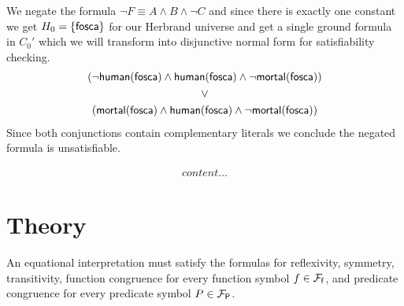 

	We negate the formula $\lnot F \equiv A\land B \land\lnot C$ and since there is exactly one constant we get
	$H_0 = \{ \mathsf{fosca} \}$ for our Herbrand universe and get a single ground formula in $C_0'$
	which we will transform into 
	disjunctive normal form for satisfiability checking.
%
\begin{gather*}
(\lnot\mathsf{human}(\mathsf{fosca})\land\mathsf{human}(\mathsf{fosca})\land\lnot\mathsf{mortal}(\mathsf{fosca}))
\\ 
\lor
\\ 
(\mathsf{mortal}(\mathsf{fosca})\land\mathsf{human}(\mathsf{fosca})\land\lnot\mathsf{mortal}(\mathsf{fosca}))
\end{gather*}
Since both conjunctions contain complementary literals we conclude the negated formula is unsatisfiable.


\begin{gather*}
content...
\end{gather*}


\section{Theory}



	An equational interpretation must satisfy the formulas for reflexivity, symmetry, transitivity, 
	function congruence for every function symbol $f\in{{\mathcal F}_{\mathsf f}}$, 
	and predicate congruence for every predicate symbol $P\in{{\mathcal F}_{\mathsf P}}$.

%

